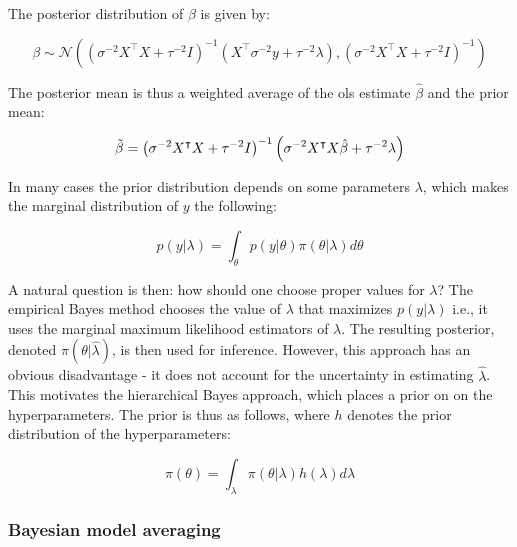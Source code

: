 \documentclass{report}
\begin{document}
The posterior distribution of $\beta$ is given by:

\begin{equation}\label{eq:ols-bayes-beta-posterior-dist}
    \beta \sim \mathcal{N}\left(\left(\sigma^{-2}X^\intercal X + \tau^{-2} I\right)^{-1}\left(X^\intercal \sigma^{-2} y + \tau^{-2} \lambda\right), \left(\sigma^{-2}X^\intercal X + \tau^{-2} I\right)^{-1}\right)
\end{equation}

The posterior mean is thus a weighted average of the \gls{ols} estimate $\hat{\beta}$ and the prior mean:

\begin{equation}\label{eq:ols-bayes-beta-posterior-mean}
    \Tilde{\beta} = \left(\sigma^{-2} X^\intercal X + \tau^{-2} I\right)^{-1}\left(\sigma^{-2} X^\intercal X \hat{\beta} + \tau^{-2} \lambda\right)
\end{equation}

In many cases the prior distribution depends on some parameters $\lambda$, which makes the marginal distribution of $y$ the following:

\begin{equation}\label{eq:ols-bayes-y-marginal-on-lambda}
    p(y | \lambda) = \int_\theta p(y | \theta) \pi(\theta | \lambda) d\theta
\end{equation}

A natural question is then: how should one choose proper values for $\lambda$? The empirical Bayes method chooses the value of $\lambda$ that maximizes $p(y | \lambda)$ i.e., it uses the marginal maximum likelihood estimators of $\lambda$. The resulting posterior, denoted $\pi\left(\theta | \hat{\lambda}\right)$, is then used for inference. However, this approach has an obvious disadvantage - it does not account for the uncertainty in estimating $\hat{\lambda}$. This motivates the hierarchical Bayes approach, which places a prior on on the hyperparameters. The prior is thus as follows, where $h$ denotes the prior distribution of the hyperparameters:

\begin{equation}\label{eq:ols-bayes-hierarchical-prior}
    \pi(\theta) = \int_\lambda \pi(\theta | \lambda) h(\lambda) d\lambda
\end{equation}

\subsubsection{Bayesian model averaging}
\end{document}

